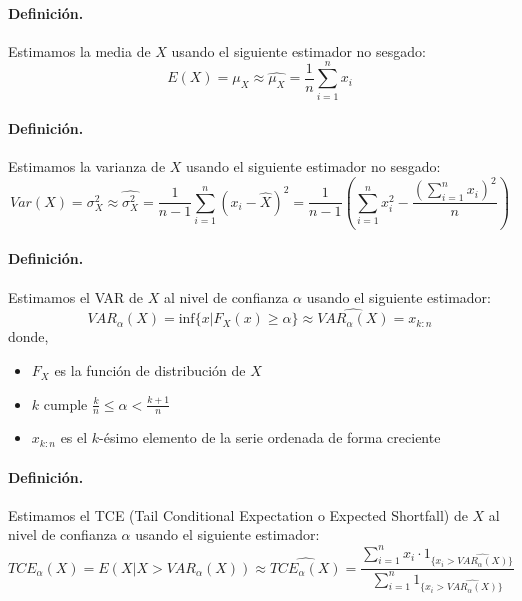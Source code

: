 \paragraph{Definici\'on.} Estimamos la media de $X$ usando el siguiente
estimador no sesgado:
\begin{displaymath}
E(X) = \mu_X  \approx \widehat{\mu_X} = \frac{1}{n} \sum_{i=1}^{n} x_i
\end{displaymath}

\paragraph{Definici\'on.} Estimamos la varianza de $X$ usando el siguiente
estimador no sesgado:
\begin{displaymath}
Var(X) = \sigma_{X}^{2} \approx \widehat{\sigma_{X}^{2}} =
\frac{1}{n-1} \sum_{i=1}^{n} (x_i - \widehat{X})^2 =
\frac{1}{n-1} \left( \sum_{i=1}^{n} x_i^2 - \frac{\left(\sum_{i=1}^{n} x_i \right)^2}{n} \right)
\end{displaymath}

\paragraph{Definici\'on.} Estimamos el VAR de $X$ al nivel de confianza $\alpha$
usando el siguiente estimador:
\begin{displaymath}
VAR_{\alpha}(X) = \textrm{inf}\{x | F_X(x) \geq \alpha \} \approx \widehat{VAR_{\alpha}(X)} = x_{k:n}
\end{displaymath}
donde,
\begin{itemize}
\item $F_X$ es la funci\'on de distribuci\'on de $X$
\item $k$ cumple $\frac{k}{n} \leq \alpha < \frac{k+1}{n}$
\item $x_{k:n}$ es el $k$-\'esimo elemento de la serie ordenada de forma creciente
\end{itemize}

\paragraph{Definici\'on.} Estimamos el TCE (Tail Conditional Expectation o Expected Shortfall)
de $X$ al nivel de confianza $\alpha$ usando el siguiente estimador:
\begin{displaymath}
TCE_{\alpha}(X) = E(X | X > VAR_{\alpha}(X)) \approx \widehat{TCE_{\alpha}(X)} =
\frac{\sum_{i=1}^{n} x_i \cdot \textrm{1}_{\{x_i >  \widehat{VAR_{\alpha}(X)}\}}}{\sum_{i=1}^{n} \textrm{1}_{\{x_i >  \widehat{VAR_{\alpha}(X)}\}}}
\end{displaymath}

